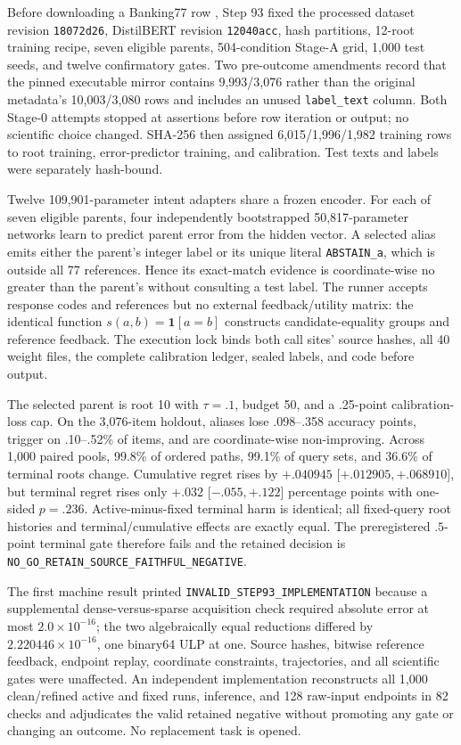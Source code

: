 Before downloading a Banking77 row \citep{casanueva2020banking77}, Step 93 fixed the processed dataset revision \texttt{18072d26}, DistilBERT revision \texttt{12040acc}, hash partitions, 12-root training recipe, seven eligible parents, 504-condition Stage-A grid, 1,000 test seeds, and twelve confirmatory gates. Two pre-outcome amendments record that the pinned executable mirror contains 9,993/3,076 rather than the original metadata's 10,003/3,080 rows and includes an unused \texttt{label\_text} column. Both Stage-0 attempts stopped at assertions before row iteration or output; no scientific choice changed. SHA-256 then assigned 6,015/1,996/1,982 training rows to root training, error-predictor training, and calibration. Test texts and labels were separately hash-bound.

Twelve 109,901-parameter intent adapters share a frozen encoder. For each of seven eligible parents, four independently bootstrapped 50,817-parameter networks learn to predict parent error from the hidden vector. A selected alias emits either the parent's integer label or its unique literal \texttt{ABSTAIN\_a}, which is outside all 77 references. Hence its exact-match evidence is coordinate-wise no greater than the parent's without consulting a test label. The runner accepts response codes and references but no external feedback/utility matrix: the identical function $s(a,b)=\mathbf 1[a=b]$ constructs candidate-equality groups and reference feedback. The execution lock binds both call sites' source hashes, all 40 weight files, the complete calibration ledger, sealed labels, and code before output.



The selected parent is root 10 with $\tau=.1$, budget 50, and a .25-point calibration-loss cap. On the 3,076-item holdout, aliases lose .098--.358 accuracy points, trigger on .10--.52\% of items, and are coordinate-wise non-improving. Across 1,000 paired pools, 99.8\% of ordered paths, 99.1\% of query sets, and 36.6\% of terminal roots change. Cumulative regret rises by $+.040945$ [$+.012905,+.068910$], but terminal regret rises only $+.032$ [$-.055,+.122$] percentage points with one-sided $p=.236$. Active-minus-fixed terminal harm is identical; all fixed-query root histories and terminal/cumulative effects are exactly equal. The preregistered $.5$-point terminal gate therefore fails and the retained decision is \texttt{NO\_GO\_RETAIN\_SOURCE\_FAITHFUL\_NEGATIVE}.

The first machine result printed \texttt{INVALID\_STEP93\_IMPLEMENTATION} because a supplemental dense-versus-sparse acquisition check required absolute error at most $2.0\times10^{-16}$; the two algebraically equal reductions differed by $2.220446\times10^{-16}$, one binary64 ULP at one. Source hashes, bitwise reference feedback, endpoint replay, coordinate constraints, trajectories, and all scientific gates were unaffected. An independent implementation reconstructs all 1,000 clean/refined active and fixed runs, inference, and 128 raw-input endpoints in 82 checks and adjudicates the valid retained negative without promoting any gate or changing an outcome. No replacement task is opened.

